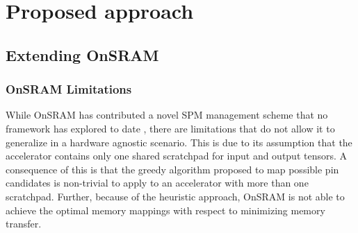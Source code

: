 
\chapter{Proposed approach} %

\label{Chapter4} %






\section{Extending OnSRAM}


\subsection{OnSRAM Limitations}

While OnSRAM has contributed a novel SPM management scheme that no framework
has explored to date \cite{onsram}, there are limitations that do not allow it to
generalize in a hardware agnostic scenario. This is due to its assumption that
the accelerator contains only one shared scratchpad for input and output
tensors. A consequence of this is that the greedy algorithm proposed to map
possible pin candidates is non-trivial to apply to an accelerator with more
than one scratchpad. Further, because of the heuristic approach, OnSRAM is not
able to achieve the optimal memory mappings with respect to minimizing memory
transfer.

